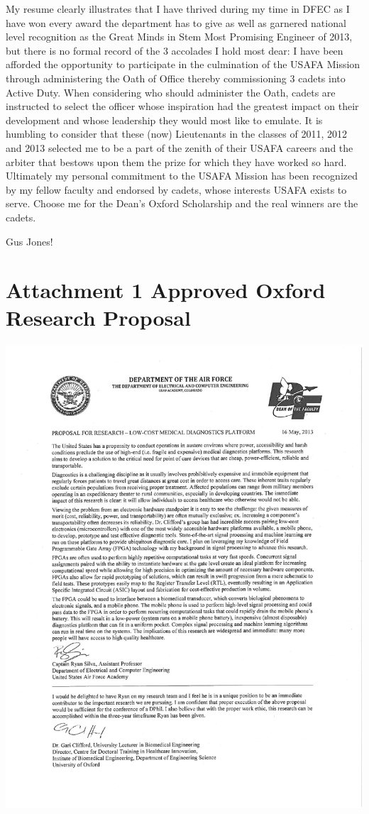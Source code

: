 \documentclass{article}
\begin{document}
My resume clearly illustrates that I have thrived during my time in DFEC as I
have won every award the department has to give as well as garnered national
level recognition as the Great Minds in Stem Most Promising Engineer of 2013,
but there is no formal record of the 3 accolades I hold most dear: I have been
afforded the opportunity to participate in the culmination of the USAFA Mission
through administering the Oath of Office thereby commissioning 3 cadets into
Active Duty. When considering who should administer the Oath, cadets are
instructed to select the officer whose inspiration had the greatest impact on
their development and whose leadership they would most like to emulate. It is
humbling to consider that these (now) Lieutenants in the classes of 2011, 2012
and 2013 selected me to be a part of the zenith of their USAFA careers and the
arbiter that bestows upon them the prize for which they have worked so hard.
Ultimately my personal commitment to the USAFA Mission has been recognized by
my fellow faculty and endorsed by cadets, whose interests USAFA exists to
serve. Choose me for the Dean's Oxford Scholarship and the real winners are the
cadets.

Gus Jones!

\newpage
\section*{Attachment 1 \newline Approved Oxford Research Proposal}
\label{sec:prop}
\centering
\vspace{-5mm}
\includegraphics[scale=.85,clip=true,trim=1in .5in 1cm 0.4in]{MFR_ProposalforResearch_SilvaSIGNED.pdf}
\end{document}
